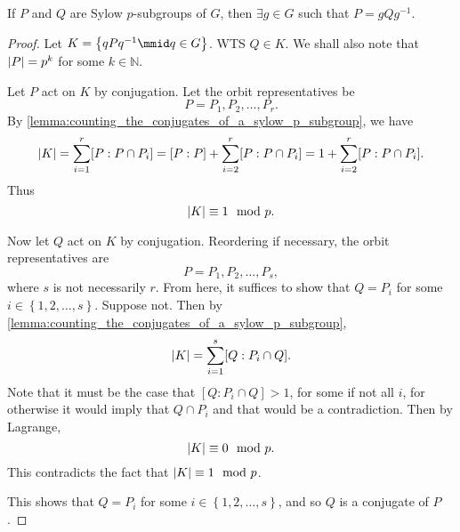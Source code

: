 \documentclass[notoc,notitlepage,nobib]{tufte-book}
\begin{document}
\begin{thm}\label{thm:second_sylow_theorem}
  If $P$ and $Q$ are Sylow $p$-subgroups of $G$, then
  $\exists g \in G$ such that $P = gQg^{-1}$.
\end{thm}

\begin{proof}
  Let $K = \left\{ qPq^{-1} \mmid q \in G \right\}$. WTS $Q \in K$.
  We shall also note that $\left|P\right| = p^k$ for some $k \in \mathbb{N}$.

  Let $P$ act on $K$ by conjugation. Let the orbit representatives be
  \begin{equation*}
    P = P_1, P_2, \ldots, P_r.
  \end{equation*}
  By \cref{lemma:counting_the_conjugates_of_a_sylow_p_subgroup}, we have
  \begin{equation*}
    \left|K\right| = \sum_{i=1}^{r} [ P : P \cap P_i ] 
            = [ P : P ] + \sum_{i=2}^{r} [ P : P \cap P_i ]
            = 1 + \sum_{i=2}^{r} [ P : P \cap P_i ].
  \end{equation*}
  Thus
  \begin{equation*}
    \left|K\right| \equiv 1 \mod p.
  \end{equation*}

  Now let $Q$ act on $K$ by conjugation. Reordering if necessary, the
  orbit representatives are
  \begin{equation*}
    P = P_1, P_2, \ldots, P_s,
  \end{equation*}
  where $s$ is not necessarily $r$. From here, it suffices to show that
  $Q = P_i$ for some $i \in \left\{ 1, 2, \ldots, s \right\}$. Suppose
  not. Then by \cref{lemma:counting_the_conjugates_of_a_sylow_p_subgroup},
  \begin{equation*}
    \left|K\right| = \sum_{i=1}^{s} [ Q : P_i \cap Q ].
  \end{equation*}
  Note that it must be the case that $[ Q : P_i \cap Q ] > 1$, for some if
  not all $i$, for otherwise it would imply that $Q \cap P_i$ and that would
  be a contradiction. Then by Lagrange,
  \begin{equation*}
    \left|K\right| \equiv 0 \mod p.
  \end{equation*}
  This contradicts the fact that $\left|K\right| \equiv 1 \mod p$.

  This shows that $Q = P_i$ for some $i \in \left\{ 1, 2, \ldots, s \right\}$,
  and so $Q$ is a conjugate of $P$.
\end{proof}
\end{document}
